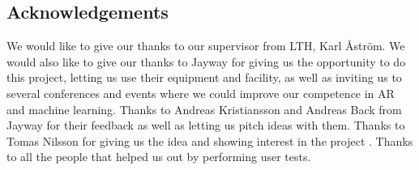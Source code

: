 \begin{center}

\section*{Acknowledgements}

\end{center}
We would like to give our thanks to our supervisor from LTH, Karl Åström. We would also like to give our thanks to Jayway for giving us the opportunity to do this project, letting us use their equipment and facility, as well as inviting us to several conferences and events where we could improve our competence in AR and machine learning. Thanks to Andreas Kristiansson and Andreas Back from Jayway for their feedback as well as letting us pitch ideas with them.
Thanks to Tomas Nilsson for giving us the idea and showing interest in the project .
Thanks to all the people that helped us out by performing user tests.

\newpage
